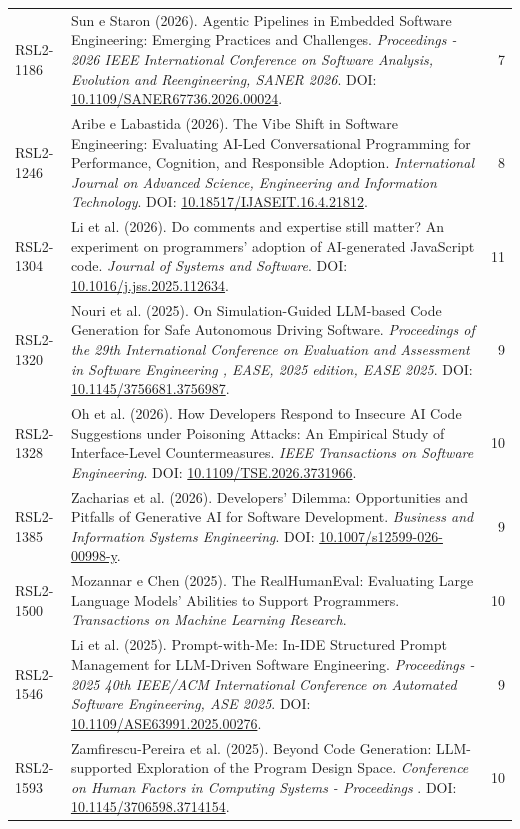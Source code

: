 \begin{small}
\begin{longtable}{lp{11.2cm}r}
RSL2-1186 & Sun e Staron (2026). Agentic Pipelines in Embedded Software Engineering: Emerging Practices and Challenges. \textit{Proceedings - 2026 IEEE International Conference on Software Analysis, Evolution and Reengineering, SANER 2026}. DOI: \url{10.1109/SANER67736.2026.00024}. & 7 \\
RSL2-1246 & Aribe e Labastida (2026). The Vibe Shift in Software Engineering: Evaluating AI-Led Conversational Programming for Performance, Cognition, and Responsible Adoption. \textit{International Journal on Advanced Science, Engineering and Information Technology}. DOI: \url{10.18517/IJASEIT.16.4.21812}. & 8 \\
RSL2-1304 & Li et al. (2026). Do comments and expertise still matter? An experiment on programmers’ adoption of AI-generated JavaScript code. \textit{Journal of Systems and Software}. DOI: \url{10.1016/j.jss.2025.112634}. & 11 \\
RSL2-1320 & Nouri et al. (2025). On Simulation-Guided LLM-based Code Generation for Safe Autonomous Driving Software. \textit{Proceedings of the 29th International Conference on Evaluation and Assessment in Software Engineering , EASE, 2025 edition, EASE 2025}. DOI: \url{10.1145/3756681.3756987}. & 9 \\
RSL2-1328 & Oh et al. (2026). How Developers Respond to Insecure AI Code Suggestions under Poisoning Attacks: An Empirical Study of Interface-Level Countermeasures. \textit{IEEE Transactions on Software Engineering}. DOI: \url{10.1109/TSE.2026.3731966}. & 10 \\
RSL2-1385 & Zacharias et al. (2026). Developers’ Dilemma: Opportunities and Pitfalls of Generative AI for Software Development. \textit{Business and Information Systems Engineering}. DOI: \url{10.1007/s12599-026-00998-y}. & 9 \\
RSL2-1500 & Mozannar e Chen (2025). The RealHumanEval: Evaluating Large Language Models’ Abilities to Support Programmers. \textit{Transactions on Machine Learning Research}. & 10 \\
RSL2-1546 & Li et al. (2025). Prompt-with-Me: In-IDE Structured Prompt Management for LLM-Driven Software Engineering. \textit{Proceedings - 2025 40th IEEE/ACM International Conference on Automated Software Engineering, ASE 2025}. DOI: \url{10.1109/ASE63991.2025.00276}. & 9 \\
RSL2-1593 & Zamfirescu-Pereira et al. (2025). Beyond Code Generation: LLM-supported Exploration of the Program Design Space. \textit{Conference on Human Factors in Computing Systems - Proceedings }. DOI: \url{10.1145/3706598.3714154}. & 10 \\

\end{longtable}
\end{small}
